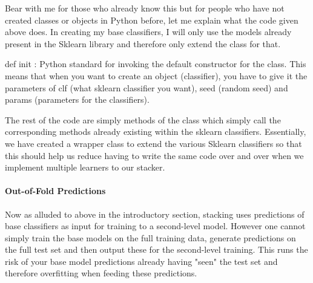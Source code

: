 \documentclass[11pt]{article}
\begin{document}
    Bear with me for those who already know this but for people who have not
created classes or objects in Python before, let me explain what the
code given above does. In creating my base classifiers, I will only use
the models already present in the Sklearn library and therefore only
extend the class for that.

def init : Python standard for invoking the default constructor for the
class. This means that when you want to create an object (classifier),
you have to give it the parameters of clf (what sklearn classifier you
want), seed (random seed) and params (parameters for the classifiers).

The rest of the code are simply methods of the class which simply call
the corresponding methods already existing within the sklearn
classifiers. Essentially, we have created a wrapper class to extend the
various Sklearn classifiers so that this should help us reduce having to
write the same code over and over when we implement multiple learners to
our stacker.

\paragraph{Out-of-Fold Predictions}\label{out-of-fold-predictions}

Now as alluded to above in the introductory section, stacking uses
predictions of base classifiers as input for training to a second-level
model. However one cannot simply train the base models on the full
training data, generate predictions on the full test set and then output
these for the second-level training. This runs the risk of your base
model predictions already having "seen" the test set and therefore
overfitting when feeding these predictions.
\end{document}
